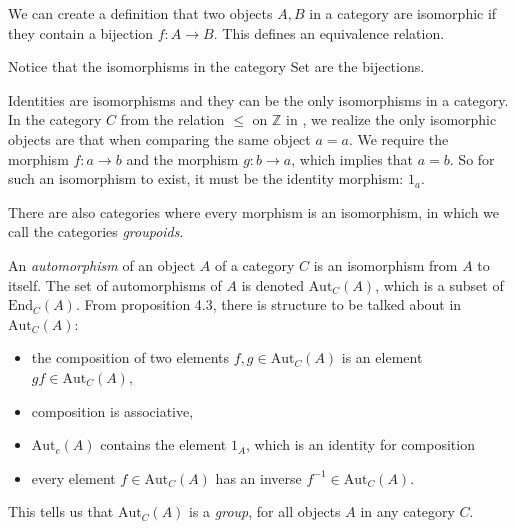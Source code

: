 \documentclass{report}
\begin{document}
We can create a definition that two objects $A, B$ in a category are isomorphic if they contain a bijection $f : A \rightarrow B$. This defines an equivalence relation.

\begin{examples}
    \begin{example}[\label{exm:1.4.4}]
        Notice that the isomorphisms in the category $\text{Set}$ are the bijections.
    \end{example}

    \begin{example}[\label{exm:1.4.5}]
        Identities are isomorphisms and they can be the only isomorphisms in a category. In the category $C$ from the relation $\leq $ on $\mathbb{Z}$ in , we realize the only isomorphic objects are that when comparing the same object $a = a$. We require the morphism $f: a \rightarrow b$ and the morphism $g : b \rightarrow a$, which implies that $a = b$. So for such an isomorphism to exist, it must be the identity morphism: $1_{a}$.
    \end{example}

    \begin{example}[\label{exm:1.4.6}]
        There are also categories where every morphism is an isomorphism, in which we call the categories \textit{groupoids}. 

        An \textit{automorphism} of an object $A$ of a category $C$ is an isomorphism from $A$ to itself. The set of automorphisms of $A$ is denoted $\text{Aut}_{C}(A)$, which is a subset of $\text{End}_{C}(A)$. From proposition 4.3, there is structure to be talked about in $\text{Aut}_{C}(A)$:
            \begin{itemize}
                \item the composition of two elements $f, g \in \text{Aut}_{C}(A)$ is an element $gf \in \text{Aut}_{C}(A)$, 

                \item composition is associative,

                \item $\text{Aut}_{c}(A)$ contains the element $1_{A}$, which is an identity for composition 

                \item every element $f \in \text{Aut}_{C}(A)$ has an inverse $f^{-1} \in \text{Aut}_{C}(A)$.
            \end{itemize}
        This tells us that $\text{Aut}_{C}(A)$ is a \textit{group}, for all objects $A$ in any category $C$.
    \end{example}
\end{examples}
\end{document}
